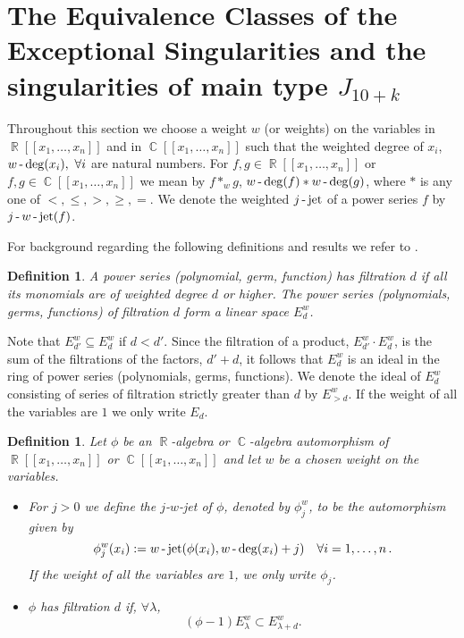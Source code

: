 \documentclass[noend]{amsproc}
\newtheorem{defn}[theorem]{Definition}
\theoremstyle{definition}
\DeclareMathOperator{\jet}{jet}
\DeclareMathOperator{\R}{\mathbb{R}}
\DeclareMathOperator{\C}{\mathbb{C}}
\DeclareMathOperator{\dash}{\textnormal{-}}
\begin{document}
\section{The Equivalence Classes of the Exceptional Singularities and the singularities of main type $J_{10+k}$}

Throughout this section we choose a weight $w$ (or weights) on the variables in $\R[[x_1,\ldots,x_n]]$ and in $\C[[x_1,\ldots,x_n]]$ such that the weighted degree of $x_i$, $w\dash\deg(x_i),\ \forall i$ are natural numbers. For $f,g\in\R[[x_1,\ldots,x_n]]$ or $f,g\in\C[[x_1,\ldots,x_n]]$ we mean by $f*_wg$, $w\dash\deg(f)* w\dash\deg(g)$, where $*$ is any one of $<,\le,>,\ge,=$. We denote the weighted $j\dash\jet$ of a power series $f$ by $j\dash w\dash\jet(f)$.

For background regarding the following definitions and results we refer to \cite{A1974}.

\begin{defn}
A power series (polynomial, germ, function) has filtration $d$ if all its monomials are of weighted degree $d$ or higher. The power series (polynomials, germs, functions) of filtration $d$ form a linear space $E_d^w$.
\end{defn}

Note that $E_{d'}^w\subseteq E_d^w$ if $d<d'$. Since the filtration of a product, $E_{d'}^w\cdot E_d^w$, is the sum of the filtrations of the factors, $d'+d$, it follows that $E_d^w$ is an ideal in the ring of power series (polynomials, germs, functions). We denote the ideal of $E_d^w$ consisting of series of filtration strictly greater than $d$ by $E_{>d}^w$. If the weight of all the variables are $1$ we only write $E_d$. 

\begin{defn}\label{phi}
Let $\phi$ be an $\R$-algebra or $\C$-algebra automorphism of $\R[[x_1,\ldots,x_n]]$ or $\C[[x_1,\ldots,x_n]]$  and let $w$ be a chosen weight on the variables. 
\begin{itemize}
\item[(i)] For $j > 0$ we define the
\emph{$j$-$w$-jet} of $\phi$, denoted by $\phi_j^w$, to be the automorphism given by
\[
\phi_j^w(x_i) := w\dash\jet(\phi(x_i),w\dash\deg(x_i)+j) \quad \forall i = 1,\ldots,n \,.
\]
If the weight of all the variables are $1$, we only write $\phi_j$.\\
\item[(ii)] $\phi$ has filtration $d$ if,  $\forall\lambda$,
\[(\phi-1)E_\lambda^w\subset E_{\lambda+d}^w.\]
\end{itemize}
\end{defn}
\end{document}
